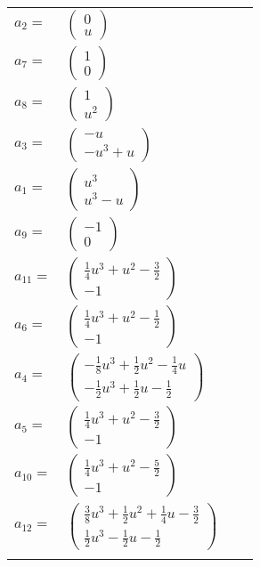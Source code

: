 \documentclass[1p]{elsarticle_modified}
\theoremstyle{definition}
\begin{document}
\begin{tabular}{m{7pt} m{180pt} m{7pt} m{180pt} }
\flushright $a_{2}=$&$\begin{pmatrix}0\\u\end{pmatrix}$ \\
\flushright $a_{7}=$&$\begin{pmatrix}1\\0\end{pmatrix}$ \\
\flushright $a_{8}=$&$\begin{pmatrix}1\\u^2\end{pmatrix}$ \\
\flushright $a_{3}=$&$\begin{pmatrix}- u\\- u^3+u\end{pmatrix}$ \\
\flushright $a_{1}=$&$\begin{pmatrix}u^3\\u^3- u\end{pmatrix}$ \\
\flushright $a_{9}=$&$\begin{pmatrix}-1\\0\end{pmatrix}$ \\
\flushright $a_{11}=$&$\begin{pmatrix}\frac{1}{4} u^3+u^2-\frac{3}{2}\\-1\end{pmatrix}$ \\
\flushright $a_{6}=$&$\begin{pmatrix}\frac{1}{4} u^3+u^2-\frac{1}{2}\\-1\end{pmatrix}$ \\
\flushright $a_{4}=$&$\begin{pmatrix}-\frac{1}{8} u^3+\frac{1}{2} u^2-\frac{1}{4} u\\-\frac{1}{2} u^3+\frac{1}{2} u-\frac{1}{2}\end{pmatrix}$ \\
\flushright $a_{5}=$&$\begin{pmatrix}\frac{1}{4} u^3+u^2-\frac{3}{2}\\-1\end{pmatrix}$ \\
\flushright $a_{10}=$&$\begin{pmatrix}\frac{1}{4} u^3+u^2-\frac{5}{2}\\-1\end{pmatrix}$ \\
\flushright $a_{12}=$&$\begin{pmatrix}\frac{3}{8} u^3+\frac{1}{2} u^2+\frac{1}{4} u-\frac{3}{2}\\\frac{1}{2} u^3-\frac{1}{2} u-\frac{1}{2}\end{pmatrix}$\\&\end{tabular}
\end{document}
